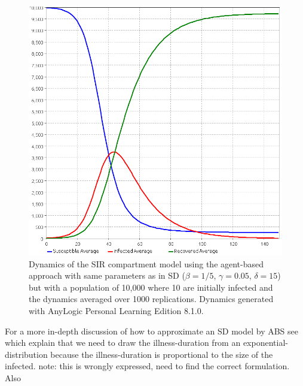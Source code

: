 \begin{figure}
	\centering
	\includegraphics[width=.4\textwidth, angle=0]{./fig/SIR_ABS_ANYLOGIC_10000Agents_10Init_1000Repls.png}
	\caption{Dynamics of the SIR compartment model using the agent-based approach with same parameters as in SD ($\beta = 1/5$, $\gamma = 0.05$, $\delta = 15$) but with a population of 10,000 where 10 are initially infected and the dynamics averaged over 1000 replications. Dynamics generated with AnyLogic Personal Learning Edition 8.1.0.}
	\label{fig:sir_abs_anylogic_agents_repls}
\end{figure}

For a more in-depth discussion of how to approximate an SD model by ABS see \cite{borshchev_system_2004} which explain that we need to draw the illness-duration from an exponential-distribution because the illness-duration is proportional to the size of the infected. note: this is wrongly expressed, need to find the correct formulation. Also \cite{macal_agent-based_2010}